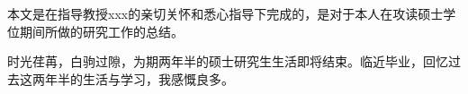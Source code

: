 \documentclass{standalone}
\begin{document}
\thesisacknowledgement

本文是在指导教授xxx的亲切关怀和悉心指导下完成的，是对于本人在攻读硕士学位期间所做的研究工作的总结。

时光荏苒，白驹过隙，为期两年半的硕士研究生生活即将结束。临近毕业，回忆过去这两年半的生活与学习，我感慨良多。




  
\end{document}
